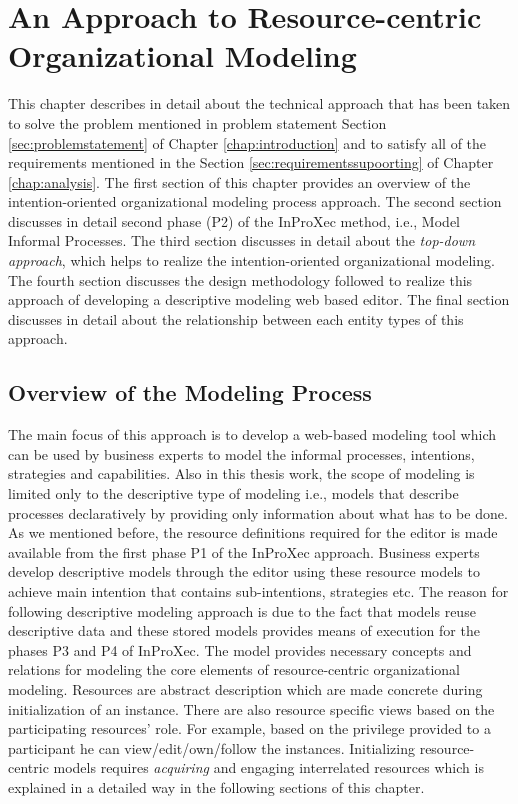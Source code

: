 \chapter{An Approach to Resource-centric Organizational Modeling}
\label{chap:approach}
This chapter describes in detail about the technical approach that has been taken to solve the problem mentioned in problem statement Section \ref{sec:problemstatement} of Chapter \ref{chap:introduction} and to satisfy all of the requirements mentioned in the Section \ref{sec:requirementssupoorting} of Chapter \ref{chap:analysis}. The first section of this chapter provides an overview of the intention-oriented organizational modeling process approach. The second section discusses in detail second phase (P2) of the InProXec method, i.e., Model Informal Processes. The third section discusses in detail about the \textit{top-down approach}, which helps to realize the intention-oriented organizational modeling. The fourth section discusses the design methodology followed to realize this approach of developing a descriptive modeling web based editor. The final section discusses in detail about the relationship between each entity types of this approach. 

\section{Overview of the Modeling Process}
\label{sec:overviewmodelingprocess}
The main focus of this approach is to develop a web-based modeling tool which can be used by business experts to model the informal processes, intentions, strategies and capabilities. Also in this thesis work, the scope of modeling is limited only to the descriptive type of modeling i.e., models that describe processes declaratively by providing only information about what has to be done. As we mentioned before, the resource definitions required for the editor is made available from the first phase P1 of the InProXec approach. Business experts develop descriptive models through the editor using these resource models to achieve main intention that contains sub-intentions, strategies etc. The reason for following descriptive modeling approach is due to the fact that models reuse descriptive data and these stored models provides means of execution for the phases P3 and P4 of InProXec. The model provides necessary concepts and relations for modeling the core elements of resource-centric organizational modeling. Resources are abstract description which are made concrete during initialization of an instance. There are also resource specific views based on the participating resources' role. For example, based on the privilege provided to a participant he can view/edit/own/follow the instances. Initializing resource-centric models requires \textit{acquiring} and engaging interrelated resources \cite{Sungur2015} which is explained in a detailed way in the following sections of this chapter. 

